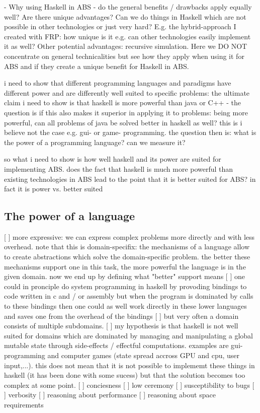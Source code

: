 - Why using Haskell in ABS - do the general benefits / drawbacks apply equally well? Are there unique advantages? Can we do things in Haskell which are not possible in other technologies or just very hard? E.g. the hybrid-approach I created with FRP: how unique is it e.g. can other technologies easily implement it as well? Other potential advantages: recursive simulation. Here we DO NOT concentrate on general technicalities but see how they apply when using it for ABS and if they create a unique benefit for Haskell in ABS.

i need to show that different programming languages and paradigms have different power and are differently well suited to specific problems: the ultimate claim i need to show is that haskell is more powerful than java or C++ - the question is if this also makes it superior in applying it to problems: being more powerful, can all problems of java be solved better in haskell as well? this is i believe not the case e.g. gui- or game- programming. the question then is: what is the power of a programming language? can we measure it?

so what i need to show is how well haskell and its power are suited for implementing ABS. does the fact that haskell is much more powerful than existing technologies in ABS lead to the point that it is better suited for ABS? in fact it is power vs. better suited

\subsection{The power of a language}
[ ] more expressive: we can express complex problems more directly and with less  overhead. note that this is domain-specifix: the mechanisms of a language allow to create abstractions which solve the domain-specific problem. the better these mechanisms support one in this task, the more powerful the language is in the given domain. now we end up by defining what "better" support means
[ ] one could in pronciple do system programming in haskell by provoding bindings to code written in c and / or assembly but when the program is dominated by calls to these bindings then one could as well work directly in these lower languages and saves one from the overhead of the bindings
[ ] but very often a domain consists of multiple subdomains.
[ ] my hypothesis is that haskell is not well suited for domains which are dominated by managing and manipulating a global mutable state through side-effects / effectful computations. examples are gui-programming and computer games (state spread accross GPU and cpu, user input,...). this does not mean that it is not possible to implememt these things in haskell (it has been done with some sucess) but that the solution becomes too complex at some point.
[ ] conciesness
[ ] low ceremony
[ ] susceptibility to bugs
[ ] verbosity
[ ] reasoning about performance
[ ] reasoning about space requirements

